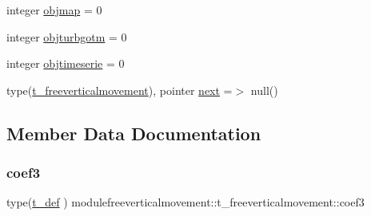 \begin{DoxyCompactItemize}
integer \mbox{\hyperlink{structmodulefreeverticalmovement_1_1t__freeverticalmovement_afc3282eb941dfaf4ee46d43ac9b64ee7}{objmap}} = 0
\item 
integer \mbox{\hyperlink{structmodulefreeverticalmovement_1_1t__freeverticalmovement_a2b2cc6fb8646ac8843bddf5f5279f9b7}{objturbgotm}} = 0
\item 
integer \mbox{\hyperlink{structmodulefreeverticalmovement_1_1t__freeverticalmovement_a41db6d1c886e8d0cee7f892d853aa046}{objtimeserie}} = 0
\item 
type(\mbox{\hyperlink{structmodulefreeverticalmovement_1_1t__freeverticalmovement}{t\+\_\+freeverticalmovement}}), pointer \mbox{\hyperlink{structmodulefreeverticalmovement_1_1t__freeverticalmovement_a6fc89941cf339263676df09fe78c5d41}{next}} =$>$ null()
\end{DoxyCompactItemize}


\subsection{Member Data Documentation}
\mbox{\label{structmodulefreeverticalmovement_1_1t__freeverticalmovement_ac9608d51927e76d24c4e3589edef4440}} 
\subsubsection{\texorpdfstring{coef3}{coef3}}
{\footnotesize\ttfamily type(\mbox{\hyperlink{structmodulefreeverticalmovement_1_1t__def}{t\+\_\+def}} ) modulefreeverticalmovement\+::t\+\_\+freeverticalmovement\+::coef3\hspace{0.3cm}{\ttfamily [private]}}

\mbox{\label{structmodulefreeverticalmovement_1_1t__freeverticalmovement_adfd0c16322c120e84bb18bc89f37f9db}} 

